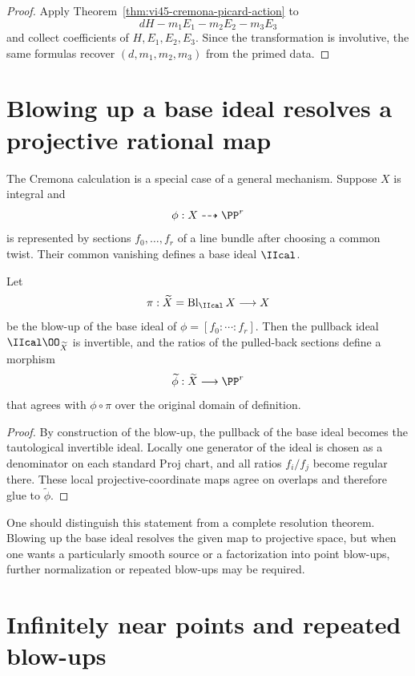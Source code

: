 \begin{proof}
Apply Theorem~\ref{thm:vi45-cremona-picard-action} to
\[
  dH-m_1E_1-m_2E_2-m_3E_3
\]
and collect coefficients of \(H,E_1,E_2,E_3\).  Since the transformation is involutive, the same formulas recover \((d,m_1,m_2,m_3)\) from the primed data.
\end{proof}



\section{Blowing up a base ideal resolves a projective rational map}

The Cremona calculation is a special case of a general mechanism.  Suppose \(X\) is integral and
\[
  \phi:X\dashrightarrow\PP^r
\]
is represented by sections \(f_0,\ldots,f_r\) of a line bundle after choosing a common twist.  Their common vanishing defines a base ideal \(\IIcal\).

\begin{theorem}\label{thm:vi45-base-ideal-resolution}
Let
\[
  \pi:\widetilde X=\Bl_{\IIcal}X\longrightarrow X
\]
be the blow-up of the base ideal of \(\phi=[f_0:\cdots:f_r]\).  Then the pullback ideal \(\IIcal\OO_{\widetilde X}\) is invertible, and the ratios of the pulled-back sections define a morphism
\[
  \widetilde\phi:\widetilde X\longrightarrow\PP^r
\]
that agrees with \(\phi\circ\pi\) over the original domain of definition.
\end{theorem}

\begin{proof}
By construction of the blow-up, the pullback of the base ideal becomes the tautological invertible ideal.  Locally one generator of the ideal is chosen as a denominator on each standard Proj chart, and all ratios \(f_i/f_j\) become regular there.  These local projective-coordinate maps agree on overlaps and therefore glue to \(\widetilde\phi\).
\end{proof}

One should distinguish this statement from a complete resolution theorem.  Blowing up the base ideal resolves the given map to projective space, but when one wants a particularly smooth source or a factorization into point blow-ups, further normalization or repeated blow-ups may be required.

\section{Infinitely near points and repeated blow-ups}


